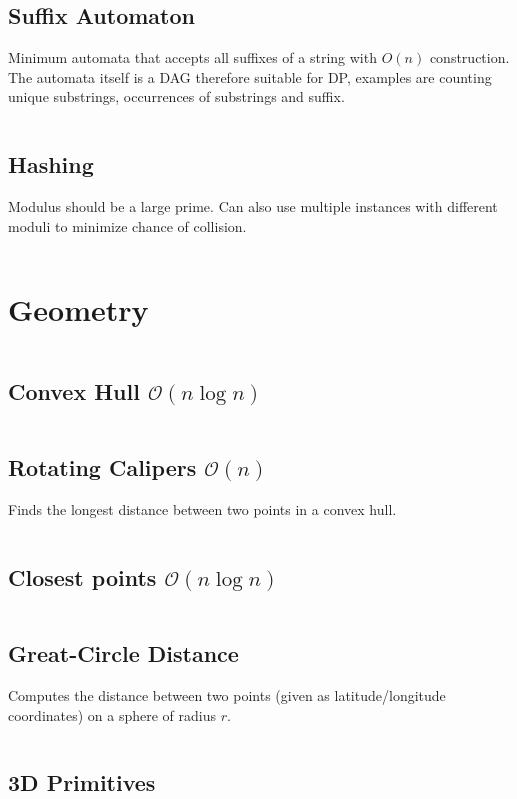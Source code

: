 \documentclass[8pt,a4paper,landscape,oneside]{amsart}
\newcommand{\mintedstyle}[2]{\inputminted[fontsize=\normalsize,baselinestretch=.9,breaklines,tabsize=2]{#1}{code/#2}}
\newcommand{\code}[1]{\mintedstyle{cpp}{#1}}
\begin{document}
\begin{multicols*}{3}
\subsection{Suffix Automaton}
Minimum automata that accepts all suffixes of a string with $O(n)$
construction. The automata itself is a DAG therefore suitable for DP,
examples are counting unique substrings, occurrences of substrings and
suffix.
\code{strings/suffix_automaton.cpp}

\subsection{Hashing}
Modulus should be a large prime. Can also use multiple instances with
different moduli to minimize chance of collision.
\code{strings/hasher.cpp}

\section{Geometry}
\code{geometry/main.cpp}

\subsection{Convex Hull $\mathcal{O}(n \log n)$}
\code{geometry/convex_hull.cpp}

\subsection{Rotating Calipers $\mathcal{O}(n)$}
Finds the longest distance between two points in a convex hull.
\code{geometry/rotating_calipers.cpp}

\subsection{Closest points $\mathcal{O}(n \log n)$}
\code{geometry/closest_points.cpp}

\subsection{Great-Circle Distance}
Computes the distance between two points (given as latitude/longitude
coordinates) on a sphere of radius $r$.
\code{geometry/gc_distance.cpp}

\subsection{3D Primitives}
\code{geometry/primitives3d.cpp}


\end{multicols*}
\end{document}
